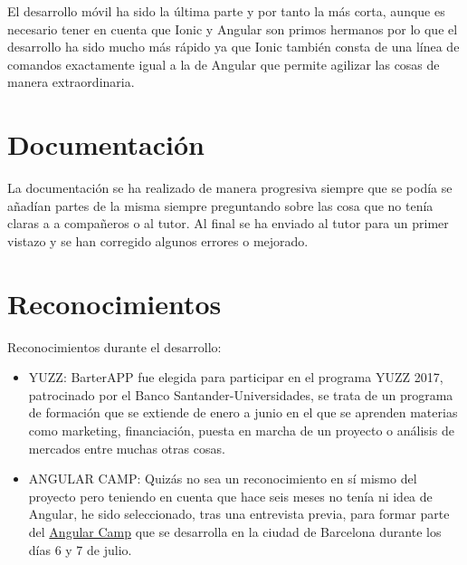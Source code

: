    El desarrollo móvil ha sido la última parte y por tanto la más corta, aunque es necesario tener en cuenta que Ionic y Angular son primos hermanos por lo que el desarrollo ha sido mucho más rápido ya que Ionic también consta de una línea de comandos exactamente igual a la de Angular que permite agilizar las cosas de manera extraordinaria.
   
   \section{Documentación}\label{docs}
   
   La documentación se ha realizado de manera progresiva siempre que se podía se añadían partes de la misma siempre preguntando sobre las cosa que no tenía claras a a compañeros o al tutor.  Al final se ha enviado al tutor para un primer vistazo y se han corregido algunos errores o mejorado.
   

   
   \section{Reconocimientos}\label{reconocimientos}
   
   Reconocimientos durante el desarrollo:
   
   \begin{itemize}
	\item YUZZ: BarterAPP fue elegida para participar en el programa YUZZ 2017, patrocinado por el Banco Santander-Universidades, se trata de un programa de formación que se extiende de enero a junio en el que se aprenden materias como marketing, financiación, puesta en marcha de un proyecto o análisis de mercados entre muchas otras cosas. 
	\item ANGULAR CAMP: Quizás no sea un reconocimiento en sí mismo del proyecto pero teniendo en cuenta que hace seis meses no tenía ni idea de Angular, he sido seleccionado, tras una entrevista previa, para formar parte del  \href{https://angularcamp.org/}{Angular Camp} que se desarrolla en la ciudad de Barcelona durante los días 6 y 7 de julio.
\end{itemize}


